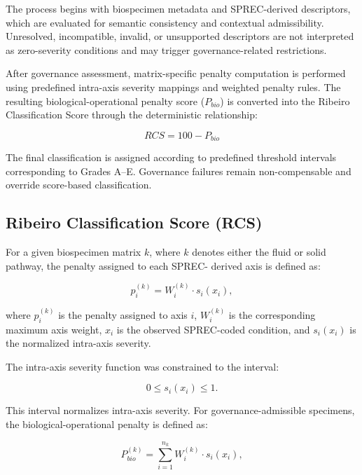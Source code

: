 \documentclass[preprint,12pt]{elsarticle}
\begin{document}
The process begins with biospecimen metadata and SPREC-derived descriptors, which are evaluated for semantic consistency and 
contextual admissibility. Unresolved, incompatible, invalid, or unsupported descriptors are not interpreted as zero-severity 
conditions and may trigger governance-related restrictions.

After governance assessment, matrix-specific penalty computation is performed using predefined intra-axis severity mappings and 
weighted penalty rules. The resulting biological-operational penalty score ($P_{bio}$) is converted into the Ribeiro Classification 
Score through the deterministic relationship:

\begin{equation}
RCS = 100 - P_{bio}
\label{eq:rcs_definition}
\end{equation}

The final classification is assigned according to predefined threshold intervals corresponding to Grades A--E. Governance failures 
remain non-compensable and override score-based classification.

\subsection{Ribeiro Classification Score (RCS)}\label{subsec:rcs_model}

For a given biospecimen matrix \(k\), where \(k\) denotes either the fluid or solid pathway, the penalty assigned to each SPREC-
derived axis is defined as:

\begin{equation}
p_i^{(k)} = W_i^{(k)} \cdot s_i(x_i),
\label{eq:axis_penalty}
\end{equation}

where \(p_i^{(k)}\) is the penalty assigned to axis \(i\), \(W_i^{(k)}\) is the corresponding maximum axis weight, \(x_i\) is the 
observed SPREC-coded condition, and \(s_i(x_i)\) is the normalized intra-axis severity.

The intra-axis severity function was constrained to the interval:

\begin{equation}
0 \leq s_i(x_i) \leq 1.
\label{eq:severity_interval}
\end{equation}

This interval normalizes intra-axis severity. For governance-admissible specimens, the biological-operational penalty is defined as:

\begin{equation}
P_{bio}^{(k)} = \sum_{i=1}^{n_k} W_i^{(k)} \cdot s_i(x_i),
\label{eq:total_penalty}
\end{equation}
\end{document}
